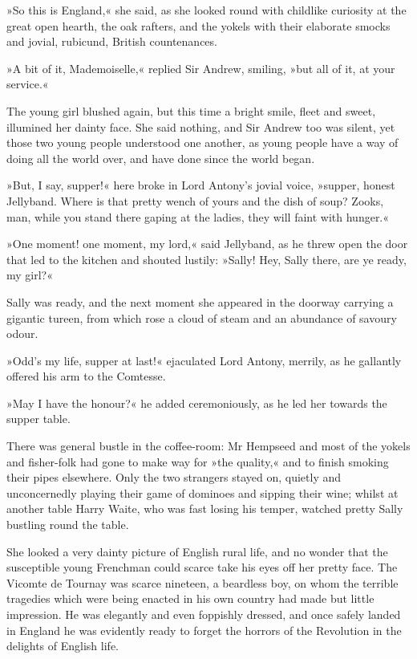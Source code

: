 »So this is England,« she said, as she looked round with childlike curiosity at the great open hearth, the oak rafters, and the yokels with their elaborate smocks and jovial, rubicund, British countenances.

»A bit of it, Mademoiselle,« replied Sir Andrew, smiling, »but all of it, at your service.«

The young girl blushed again, but this time a bright smile, fleet and sweet, illumined her dainty face. She said nothing, and Sir Andrew too was silent, yet those two young people understood one another, as young people have a way of doing all the world over, and have done since the world began.

»But, I say, supper!« here broke in Lord Antony's jovial voice, »supper, honest Jellyband. Where is that pretty wench of yours and the dish of soup? Zooks, man, while you stand there gaping at the ladies, they will faint with hunger.«

»One moment! one moment, my lord,« said Jellyband, as he threw open the door that led to the kitchen and shouted lustily: »Sally! Hey, Sally there, are ye ready, my girl?«

Sally was ready, and the next moment she appeared in the doorway carrying a gigantic tureen, from which rose a cloud of steam and an abundance of savoury odour.

»Odd's my life, supper at last!« ejaculated Lord Antony, merrily, as he gallantly offered his arm to the Comtesse.

»May I have the honour?« he added ceremoniously, as he led her towards the supper table.

There was general bustle in the coffee-room: Mr Hempseed and most of the yokels and fisher-folk had gone to make way for »the quality,« and to finish smoking their pipes elsewhere. Only the two strangers stayed on, quietly and unconcernedly playing their game of dominoes and sipping their wine; whilst at another table Harry Waite, who was fast losing his temper, watched pretty Sally bustling round the table.

She looked a very dainty picture of English rural life, and no wonder that the susceptible young Frenchman could scarce take his eyes off her pretty face. The Vicomte de Tournay was scarce nineteen, a beardless boy, on whom the terrible tragedies which were being enacted in his own country had made but little impression. He was elegantly and even foppishly dressed, and once safely landed in England he was evidently ready to forget the horrors of the Revolution in the delights of English life.

